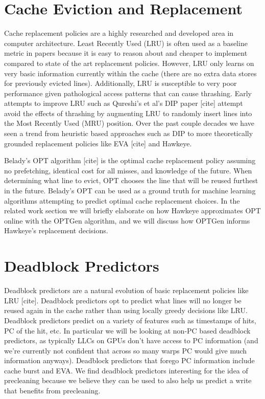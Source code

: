 \section{Cache Eviction and Replacement}
Cache replacement policies are a highly researched and developed area in computer architecture. Least Recently Used (LRU) is often used as a baseline metric in papers because it is easy to reason about and cheaper to implement compared to state of the art replacement policies. However, LRU only learns on very basic information currently within the cache (there are no extra data stores for previously evicted lines). Additionally, LRU is susceptible to very poor performance given pathological access patterns that can cause thrashing. Early attempts to improve LRU such as Qureshi’s et al’s DIP paper [cite] attempt avoid the effects of thrashing by augmenting LRU to randomly insert lines into the Most Recently Used (MRU) position. Over the past couple decades we have seen a trend from heuristic based approaches such as DIP to more theoretically grounded replacement policies like EVA [cite] and Hawkeye.

Belady’s OPT algorithm [cite] is the optimal cache replacement policy assuming no prefetching, identical cost for all misses, and knowledge of the future. When determining what line to evict, OPT chooses the line that will be reused furthest in the future. Belady’s OPT can be used as a ground truth for machine learning algorithms attempting to predict optimal cache replacement choices. In the related work section we will briefly elaborate on how Hawkeye approximates OPT online with the OPTGen algorithm, and we will discuss how OPTGen informs Hawkeye’s replacement decisions.

\section{Deadblock Predictors}
Deadblock predictors are a natural evolution of basic replacement policies like LRU [cite]. Deadblock predictors opt to predict what lines will no longer be reused again in the cache rather than using locally greedy decisions like LRU. Deadblock predictors predict on a variety of features such as timestamps of hits, PC of the hit, etc. In particular we will be looking at non-PC based deadblock predictors, as typically LLCs on GPUs don’t have access to PC information (and we’re currently not confident that across so many warps PC would give much information anyways). Deadblock predictors that forego PC information include cache burst and EVA. We find deadblock predictors interesting for the idea of precleaning because we believe they can be used to also help us predict a write that benefits from precleaning.

